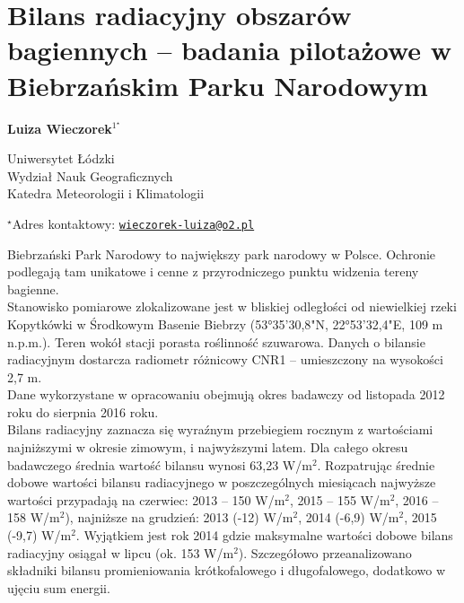 \documentclass[\main/boa.tex]{subfiles}
\begin{document}
\section{Bilans radiacyjny obszarów bagiennych -- badania pilotażowe w Biebrzańskim Parku Narodowym}

\begin{center}
  {\bf {} Luiza Wieczorek$^{1^\star}$}
\end{center}

\vskip 0.3cm

\begin{affiliations}
\begin{enumerate}
\begin{minipage}{0.915\textwidth}
\centering
\item Uniwersytet Łódzki \\ Wydział Nauk Geograficznych \\ Katedra Meteorologii i Klimatologii\\[-2pt]
\end{minipage}
\end{enumerate}
$^\star$Adres kontaktowy: \href{mailto:wieczorek-luiza@o2.pl}{\nolinkurl{wieczorek-luiza@o2.pl}}\\
\end{affiliations}

\vskip 0.5cm


\vskip 0.5cm

Biebrzański Park Narodowy to największy park narodowy w Polsce. Ochronie podlegają tam unikatowe i cenne z przyrodniczego punktu widzenia tereny bagienne. \\
Stanowisko pomiarowe zlokalizowane jest w bliskiej odległości od niewielkiej rzeki Kopytkówki w Środkowym Basenie Biebrzy (53°35'30,8"N, 22°53'32,4"E, 109 m n.p.m.). Teren wokół stacji porasta roślinność szuwarowa. Danych o bilansie radiacyjnym dostarcza radiometr różnicowy CNR1 – umieszczony na wysokości 2,7 m. \\
Dane wykorzystane w opracowaniu obejmują okres badawczy od listopada 2012 roku do sierpnia 2016 roku.\\
Bilans radiacyjny zaznacza się wyraźnym przebiegiem rocznym z wartościami najniższymi w okresie zimowym, i najwyższymi latem. Dla całego okresu badawczego średnia wartość bilansu wynosi 63,23 W/m$^{2}$. Rozpatrując średnie dobowe wartości bilansu radiacyjnego w poszczególnych miesiącach najwyższe wartości przypadają na czerwiec: 2013 -- 150 W/m$^{2}$, 2015 -- 155 W/m$^{2}$, 2016 -- 158 W/m$^{2}$), najniższe na grudzień: 2013 (-12) W/m$^{2}$, 2014               (-6,9) W/m$^{2}$, 2015 (-9,7) W/m$^{2}$. Wyjątkiem jest rok 2014 gdzie maksymalne wartości dobowe bilans radiacyjny osiągał w lipcu (ok. 153 W/m$^{2}$). Szczegółowo przeanalizowano składniki bilansu promieniowania krótkofalowego i długofalowego, dodatkowo w ujęciu sum energii. 
\end{document}
